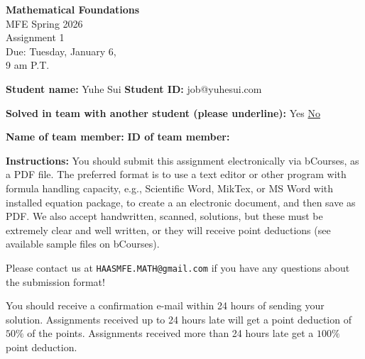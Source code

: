 \documentclass{article}
\begin{document}
\begin{center}
\textbf{Mathematical Foundations} \\
MFE Spring 2026 \\
Assignment 1 \\
Due: Tuesday, January 6, \\
9 am P.T.
\end{center}

\vspace{1em}


\noindent \textbf{Student name:} Yuhe Sui \hspace{3.54cm} \textbf{Student ID:} job@yuhesui.com

\vspace{1em}

\noindent \textbf{Solved in team with another student (please underline):} \hspace{1cm} Yes \hspace{1cm} \underline{No}

\vspace{1em}

\noindent \textbf{Name of team member:} \hspace{3cm} \textbf{ID of team member:}

\vspace{1em}

\noindent \textbf{Instructions:} You should submit this assignment electronically via bCourses, as a PDF file. The preferred format is to use a text editor or other program with formula handling capacity, e.g., Scientific Word, MikTex, or MS Word with installed equation package, to create a an electronic document, and then save as PDF. We also accept handwritten, scanned, solutions, but these must be extremely clear and well written, or they will receive point deductions (see available sample files on bCourses).

\vspace{1em}

\noindent Please contact us at \texttt{HAASMFE.MATH@gmail.com} if you have any questions about the submission format!

\vspace{1em}

\noindent You should receive a confirmation e-mail within 24 hours of sending your solution. Assignments received up to 24 hours late will get a point deduction of $50\%$ of the points. Assignments received more than 24 hours late get a $100\%$ point deduction.
\end{document}
